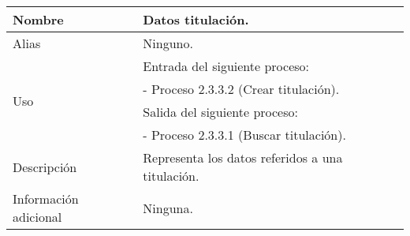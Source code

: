 \begin{center}
  \begin{tabular}{| l | p{9cm} |}
    \hline
    Nombre & \textbf{Datos titulación}.\\
    \hline
    Alias & Ninguno.\\
    \hline
    \multirow{4}{*}{Uso} & Entrada del siguiente proceso:\\
                         & - Proceso 2.3.3.2 (Crear titulación).\\
                         & Salida del siguiente proceso:\\
                         & - Proceso 2.3.3.1 (Buscar titulación).\\
    \hline
    Descripción & Representa los datos referidos a una titulación.\\
    \hline
    Información adicional & Ninguna.\\
    \hline
  \end{tabular}
\end{center}
